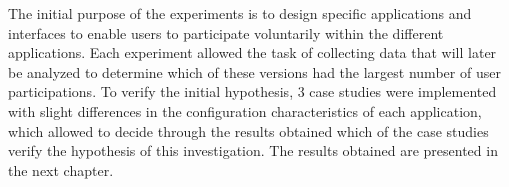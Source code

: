 The initial purpose of the experiments is to design specific applications and
interfaces to enable users to participate voluntarily within the different
applications. Each experiment allowed the task of collecting data that will
later be analyzed to determine which of these versions had the largest number of
user participations. To verify the initial hypothesis, 3 case studies were
implemented with slight differences in the configuration characteristics of each
application, which allowed to decide through the results obtained which of the
case studies verify the hypothesis of this investigation. The results obtained
are presented in the next chapter.
